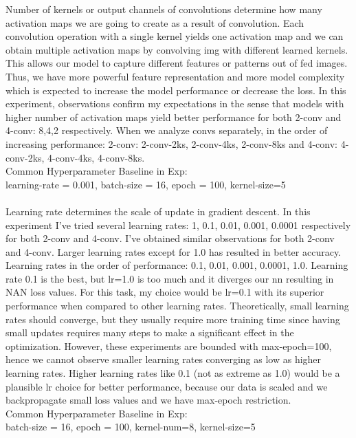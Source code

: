 \documentclass[12pt]{article}
\begin{document}
\begin{center}
        Number of kernels or output channels of convolutions determine how many activation maps we are going to create as a result of convolution.
        Each convolution operation with a single kernel yields one activation map and we can obtain multiple activation maps by convolving img with different learned kernels.
        This allows our model to capture different features or patterns out of fed images. Thus, we have more powerful feature representation and more model complexity which
        is expected to increase the model performance or decrease the loss. 
        In this experiment, observations confirm my expectations in the sense that models with higher number of activation maps yield better performance for both 2-conv and 4-conv: 8,4,2 respectively.
        When we analyze convs separately, in the order of increasing performance: 2-conv: 2-conv-2ks, 2-conv-4ks, 2-conv-8ks and 4-conv: 4-conv-2ks, 4-conv-4ks, 4-conv-8ks. 
        \\
        Common Hyperparameter Baseline in Exp: \\
        learning-rate = 0.001, batch-size = 16, epoch = 100, kernel-size=5
        \\~\\

        Learning rate determines the scale of update in gradient descent. 
        In this experiment I've tried several learning rates: 1, 0.1, 0.01, 0.001, 0.0001 respectively for both 2-conv and 4-conv.
        I've obtained similar observations for both 2-conv and 4-conv. Larger learning rates except for 1.0 has resulted in better accuracy.
        Learning rates in the order of performance: 0.1, 0.01, 0.001, 0.0001, 1.0.
        Learning rate 0.1 is the best, but lr=1.0 is too much and it diverges our nn resulting in NAN loss values.
        For this task, my choice would be lr=0.1 with its superior performance when compared to other learning rates.
        Theoretically, small learning rates should converge, but they usually require more training time since having small updates requires many steps to make a significant effect in the optimization.
        However, these experiments are bounded with max-epoch=100, hence we cannot observe smaller learning rates converging as low as higher learning rates.
        Higher learning rates like 0.1 (not as extreme as 1.0) would be a plausible lr choice for better performance, because our data is scaled and we backpropagate small loss values and we have max-epoch restriction.
        \\
        Common Hyperparameter Baseline in Exp: \\
        batch-size = 16, epoch = 100, kernel-num=8, kernel-size=5

    
    \end{center}
\end{document}
